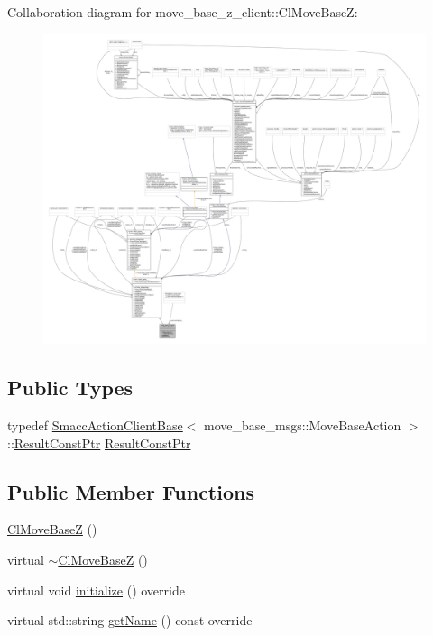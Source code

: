 Collaboration diagram for move\+\_\+base\+\_\+z\+\_\+client\+:\+:Cl\+Move\+BaseZ\+:
\nopagebreak
\begin{figure}[H]
\begin{center}
\leavevmode
\includegraphics[width=350pt]{classmove__base__z__client_1_1ClMoveBaseZ__coll__graph}
\end{center}
\end{figure}
\subsection*{Public Types}
\begin{DoxyCompactItemize}
\item 
typedef \hyperlink{classsmacc_1_1client__bases_1_1SmaccActionClientBase_a942113f29871c3e2c3fff9e951500805}{Smacc\+Action\+Client\+Base}$<$ move\+\_\+base\+\_\+msgs\+::\+Move\+Base\+Action $>$\+::\hyperlink{classmove__base__z__client_1_1ClMoveBaseZ_a3b774d99d3dd4526f99b968d65ef5834}{Result\+Const\+Ptr} \hyperlink{classmove__base__z__client_1_1ClMoveBaseZ_a3b774d99d3dd4526f99b968d65ef5834}{Result\+Const\+Ptr}
\end{DoxyCompactItemize}
\subsection*{Public Member Functions}
\begin{DoxyCompactItemize}
\item 
\hyperlink{classmove__base__z__client_1_1ClMoveBaseZ_a98f9aec59e243cd7e464c0ae6b03ed2a}{Cl\+Move\+BaseZ} ()
\item 
virtual \hyperlink{classmove__base__z__client_1_1ClMoveBaseZ_ab5de84b969e58d80723f5c0d3ce79afa}{$\sim$\+Cl\+Move\+BaseZ} ()
\item 
virtual void \hyperlink{classmove__base__z__client_1_1ClMoveBaseZ_a082cef8bf5dbd0ec06adfe2a7aefbf70}{initialize} () override
\item 
virtual std\+::string \hyperlink{classmove__base__z__client_1_1ClMoveBaseZ_aa7446f57e3740d89c71ba12f1f3c00c0}{get\+Name} () const override
\end{DoxyCompactItemize}

